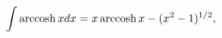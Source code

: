 \[\int\mathop{\mathrm{arccosh}\/}\nolimits xdx=x\mathop{\mathrm{arccosh}\/}%
\nolimits x-(x^{2}-1)^{1/2},\]